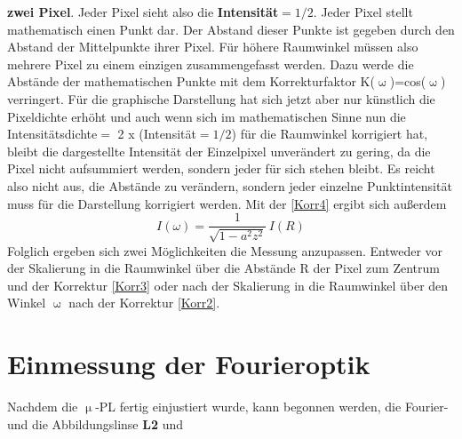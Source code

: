 \textbf{zwei Pixel}. Jeder Pixel sieht also die \textbf{Intensität$=1/2$}. Jeder
Pixel stellt mathematisch einen Punkt dar. Der Abstand dieser Punkte ist gegeben
durch den Abstand der Mittelpunkte ihrer Pixel. Für höhere Raumwinkel müssen
also mehrere Pixel zu einem einzigen zusammengefasst werden. Dazu werde die
Abstände der mathematischen Punkte mit dem Korrekturfaktor
K($\upomega$)=cos($\upomega$) verringert. Für die graphische Darstellung hat
sich jetzt aber nur künstlich die Pixeldichte erhöht und auch wenn sich im
mathematischen Sinne nun die Intensitätsdichte$=$ 2 x (Intensität$=1/2$) für die
Raumwinkel korrigiert hat, bleibt die dargestellte Intensität der Einzelpixel
unverändert zu gering, da die Pixel nicht aufsummiert werden, sondern jeder für
sich stehen bleibt. Es reicht also nicht aus, die Abstände zu verändern, sondern
jeder einzelne Punktintensität muss für die Darstellung korrigiert werden. Mit
der \autoref{Korr4} ergibt sich außerdem \begin{equation} I(\omega)=
\frac{1}{\sqrt{1-a^2z^2}} \, I(R) \label{Korr3} \end{equation} Folglich ergeben
sich zwei Möglichkeiten die Messung anzupassen. Entweder vor der Skalierung in
die Raumwinkel über die Abstände R der Pixel zum Zentrum und der Korrektur
\autoref{Korr3} oder nach der Skalierung in die Raumwinkel über den Winkel
$\upomega$ nach der Korrektur \autoref{Korr2}. \newpage \section{Einmessung der
Fourieroptik} \label{fourier} Nachdem die $\upmu$-PL fertig einjustiert wurde,
kann begonnen werden, die Fourier- und die Abbildungslinse \textbf{L2} und
